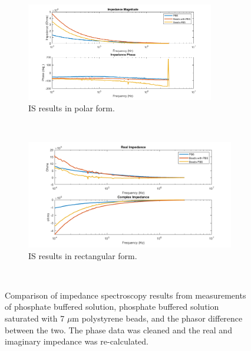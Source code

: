 \begin{figure}[h]
    \centering
    \begin{subfigure}[b]{\textwidth}
        \centering
        \includegraphics[width=0.9\textwidth]{images/correctedPolar.png}
        \caption{IS results in polar form.}
    \end{subfigure}
    \\
    \vspace{0.1 in}
    \begin{subfigure}[b]{0.9\textwidth}
        \centering
        \includegraphics[width=\textwidth]{images/correctedRectangular.png}
        \caption{IS results in rectangular form.}
    \end{subfigure}
    \\
    \vspace{0.1 in}
    \caption[PBS, PBS saturated with micro-beads, and the phasor difference.]{Comparison of impedance spectroscopy results from measurements of phosphate buffered solution, phosphate buffered solution saturated with 7 $\mu$m polystyrene beads, and the phasor difference between the two. The phase data was cleaned and the real and imaginary impedance was re-calculated.}
    \label{fig:clean_IS_data_beads_PBS_DI_comp}
\end{figure}


